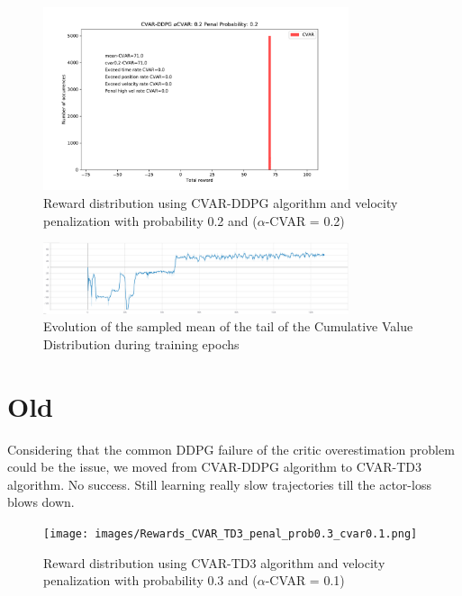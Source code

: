 \begin{figure}[ht]
        \centering
        \includegraphics[width=0.8\textwidth]{images/CVAR/Rewards_CVAR_ppenal02.pdf}
        \caption{Reward distribution using CVAR-DDPG algorithm and velocity penalization with probability 0.2 and ($\alpha$-CVAR = 0.2)}
        \label{rew_cvar_ddpg_probpenal0.2_cvar0.2}
    
\end{figure}
\begin{figure}[ht]
        \centering
        \includegraphics[width=0.8\textwidth]{images/CVAR/Cvar_evol.png}
        \caption{Evolution of the sampled mean of the tail of the Cumulative Value Distribution during training epochs}
        \label{tail_CDF_EVOL}
    
\end{figure}







\section{Old}
Considering that the common DDPG failure of the critic overestimation problem could be the issue, we moved from CVAR-DDPG algorithm to CVAR-TD3 algorithm.
No success. Still learning really slow trajectories till the actor-loss blows down.


\begin{figure}[t]
        \centering
        \texttt{[image: images/Rewards\_CVAR\_TD3\_penal\_prob0.3\_cvar0.1.png]}
        \caption{Reward distribution using CVAR-TD3 algorithm and velocity penalization with probability 0.3 and ($\alpha$-CVAR = 0.1)}
        \label{rew_cvar_td3_probpenal0.3_cvar0.1}
    
\end{figure}

